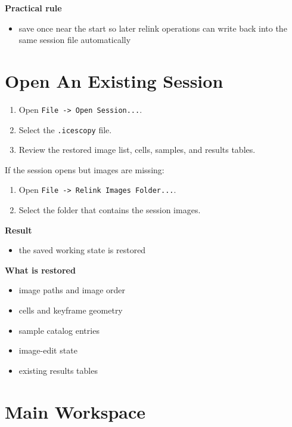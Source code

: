 \documentclass[
  9pt,
  letterpaper,
  oneside,
  open=any,
  DIV=15,
  parskip=half-,
  headings=big,
  numbers=noenddot
]{scrbook}
\newcommand{\manuallead}[1]{%
  \vspace{0.15em}%
  {\sffamily\bfseries\color{ManualBlue}#1}\par\nobreak\vspace{0.05em}%
}
\begin{document}
\manuallead{Practical rule}

\begin{itemize}[leftmargin=*,itemsep=0.35em,topsep=0.4em]
\item save once near the start so later relink operations can write back into the same session file automatically
\end{itemize}

\section{Open An Existing Session}

\begin{enumerate}[leftmargin=*,itemsep=0.35em,topsep=0.4em]
\item Open \texttt{File -> Open Session...}.
\item Select the \texttt{.icescopy} file.
\item Review the restored image list, cells, samples, and results tables.
\end{enumerate}

If the session opens but images are missing:


\begin{enumerate}[leftmargin=*,itemsep=0.35em,topsep=0.4em]
\item Open \texttt{File -> Relink Images Folder...}.
\item Select the folder that contains the session images.
\end{enumerate}

\manuallead{Result}

\begin{itemize}[leftmargin=*,itemsep=0.35em,topsep=0.4em]
\item the saved working state is restored
\end{itemize}

\manuallead{What is restored}

\begin{itemize}[leftmargin=*,itemsep=0.35em,topsep=0.4em]
\item image paths and image order
\item cells and keyframe geometry
\item sample catalog entries
\item image-edit state
\item existing results tables
\end{itemize}

\section{Main Workspace}
\end{document}
